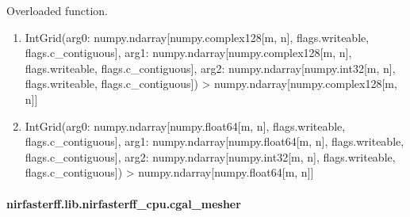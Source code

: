 \documentclass[letterpaper,10pt,english]{sphinxmanual}
\begin{document}
\begin{fulllineitems}
\label{\detokenize{_autosummary/nirfasterff.lib.nirfasterff_cpu.IntGrid:nirfasterff.lib.nirfasterff_cpu.IntGrid}}
\pysigstartsignatures
{}
\pysigstopsignatures
\sphinxAtStartPar
Overloaded function.
\begin{enumerate}
%
\item {} 
\sphinxAtStartPar
IntGrid(arg0: numpy.ndarray{[}numpy.complex128{[}m, n{]}, flags.writeable, flags.c\_contiguous{]}, arg1: numpy.ndarray{[}numpy.complex128{[}m, n{]}, flags.writeable, flags.c\_contiguous{]}, arg2: numpy.ndarray{[}numpy.int32{[}m, n{]}, flags.writeable, flags.c\_contiguous{]}) \sphinxhyphen{}\textgreater{} numpy.ndarray{[}numpy.complex128{[}m, n{]}{]}

\item {} 
\sphinxAtStartPar
IntGrid(arg0: numpy.ndarray{[}numpy.float64{[}m, n{]}, flags.writeable, flags.c\_contiguous{]}, arg1: numpy.ndarray{[}numpy.float64{[}m, n{]}, flags.writeable, flags.c\_contiguous{]}, arg2: numpy.ndarray{[}numpy.int32{[}m, n{]}, flags.writeable, flags.c\_contiguous{]}) \sphinxhyphen{}\textgreater{} numpy.ndarray{[}numpy.float64{[}m, n{]}{]}

\end{enumerate}

\end{fulllineitems}


\sphinxstepscope


\paragraph{nirfasterff.lib.nirfasterff\_cpu.cgal\_mesher}
\label{\detokenize{_autosummary/nirfasterff.lib.nirfasterff_cpu.cgal_mesher:nirfasterff-lib-nirfasterff-cpu-cgal-mesher}}\label{\detokenize{_autosummary/nirfasterff.lib.nirfasterff_cpu.cgal_mesher::doc}}
\end{document}
